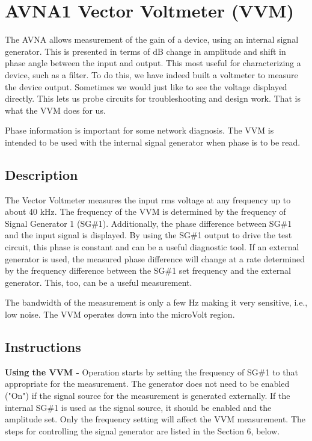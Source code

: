 \section{AVNA1 Vector Voltmeter  (VVM)}
\label{sect:VVM}
The AVNA allows measurement of the gain of a device, using an internal signal generator.  This is presented in terms of dB change in amplitude and shift in phase angle between the input and output.  This most useful for characterizing a device, such as a filter.  To do this, we have indeed built a voltmeter to measure the device output.  Sometimes we would just like to see the voltage displayed directly.  This lets us probe circuits for troubleshooting  and design work.   That is what the VVM does for us.

Phase information is important for some network diagnosis.  The VVM is intended to be used with the internal signal generator when phase is to be read.

\subsection{Description}
\label{subsect:VVMDescr}
The Vector Voltmeter measures the input rms voltage at any frequency up to about 40 kHz.  The frequency of the VVM is determined by the frequency of Signal Generator 1 (SG\#1).  Additionally, the phase difference between SG\#1 and the input signal is displayed.  By using the SG\#1 output to drive the test circuit, this phase is constant and can be a useful diagnostic tool.   If an external generator is used, the measured phase difference will change at a rate determined by the frequency difference between the SG\#1 set frequency and the external generator.    This, too, can be a useful measurement.  

The bandwidth of the measurement is only a few Hz making it very sensitive, i.e., low noise.  The VVM operates down into the microVolt  region.

\subsection{Instructions}
\label{subsect:VVMInstr}
\textbf{Using the VVM - }Operation starts  by setting the frequency of SG\#1 to that appropriate for the measurement.  The generator does not need to be enabled ("On") if the signal source for the measurement is generated externally.  If the internal SG\#1 is used as the signal source, it should be enabled and the amplitude set.   Only the frequency setting will affect the VVM measurement.  The steps for controlling the signal generator are listed in the Section 6, below.

